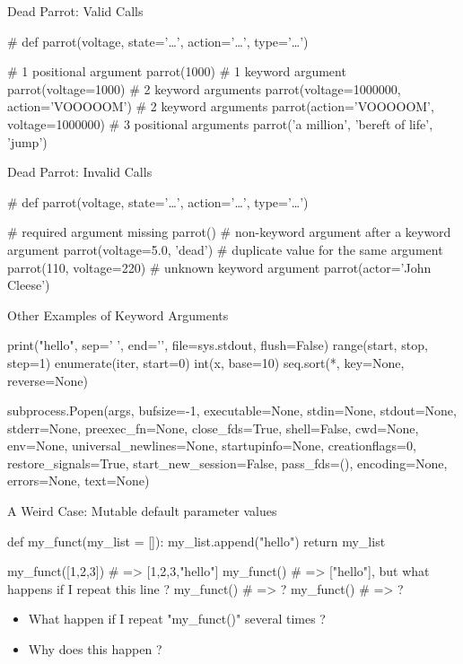 \documentclass[serif, aspectratio=169]{beamer}
\begin{document}
\begin{frame}[fragile]{Dead Parrot: Valid Calls}
    \begin{pythoncode}
    # def parrot(voltage, state='…', action='…', type='…')

    # 1 positional argument
    parrot(1000)
    # 1 keyword argument
    parrot(voltage=1000)
    # 2 keyword arguments
    parrot(voltage=1000000, action='VOOOOOM')
    # 2 keyword arguments
    parrot(action='VOOOOOM', voltage=1000000)
    # 3 positional arguments
    parrot('a million', 'bereft of life', 'jump')
    \end{pythoncode}
\end{frame}


\begin{frame}[fragile]{Dead Parrot: Invalid Calls}
    \begin{pythoncode}
    # def parrot(voltage, state='…', action='…', type='…')

    # required argument missing
    parrot()
    # non-keyword argument after a keyword argument
    parrot(voltage=5.0, 'dead')
    # duplicate value for the same argument
    parrot(110, voltage=220)
    # unknown keyword argument
    parrot(actor='John Cleese')
    \end{pythoncode}
\end{frame}

\begin{frame}[fragile]{Other Examples of Keyword Arguments}
    \begin{pythoncode}
    print("hello", sep=' ', end='\n', file=sys.stdout, flush=False)
    range(start, stop, step=1)
    enumerate(iter, start=0)
    int(x, base=10)
    seq.sort(*, key=None, reverse=None)

    subprocess.Popen(args, bufsize=-1, executable=None,
    stdin=None, stdout=None, stderr=None, preexec_fn=None,
    close_fds=True, shell=False, cwd=None, env=None,
    universal_newlines=None, startupinfo=None,
    creationflags=0, restore_signals=True,
    start_new_session=False, pass_fds=(), encoding=None,
    errors=None, text=None)
    \end{pythoncode}
\end{frame}

\begin{frame}[fragile]{A Weird Case: Mutable default parameter values}
    \begin{pythoncode}    
    def my_funct(my_list = []):
        my_list.append("hello")
        return my_list

    my_funct([1,2,3]) # => [1,2,3,"hello"]
    my_funct() # => ["hello"], but what happens if I repeat this line ?
    my_funct() # => ?
    my_funct() # => ?
    \end{pythoncode}
    \begin{block}{}
        \begin{itemize}
            \item What happen if I repeat "my\_funct()" several times ?
            \item Why does this happen ?
        \end{itemize}
    \end{block}
\end{frame}
\end{document}
